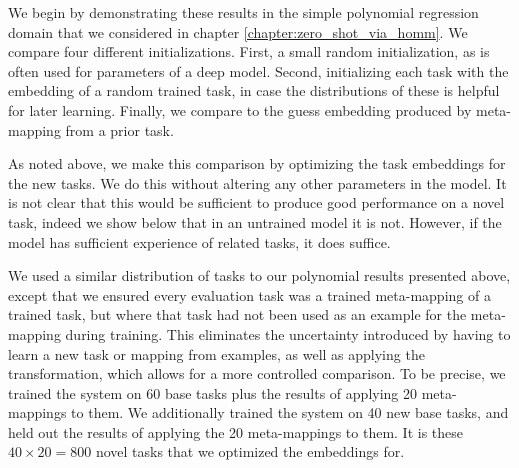 We begin by demonstrating these results in the simple polynomial regression domain that we considered in chapter \ref{chapter:zero_shot_via_homm}. We compare four different initializations. First, a small random initialization, as is often used for parameters of a deep model. Second, initializing each task with the embedding of a random trained task, in case the distributions of these is helpful for later learning. Finally, we compare to the guess embedding produced by meta-mapping from a prior task. \par 
As noted above, we make this comparison by optimizing the task embeddings for the new tasks. We do this without altering any other parameters in the model. It is not clear that this would be sufficient to produce good performance on a novel task, indeed we show below that in an untrained model it is not. However, if the model has sufficient experience of related tasks, it does suffice. \par 
We used a similar distribution of tasks to our polynomial results presented above, except that we ensured every evaluation task was a trained meta-mapping of a trained task, but where that task had not been used as an example for the meta-mapping during training. This eliminates the uncertainty introduced by having to learn a new task or mapping from examples, as well as applying the transformation, which allows for a more controlled comparison. To be precise, we trained the system on 60 base tasks plus the results of applying 20 meta-mappings to them. We additionally trained the system on 40 new base tasks, and held out the results of applying the 20 meta-mappings to them. It is these \(40 \times 20 = 800\) novel tasks that we optimized the embeddings for. \par 
